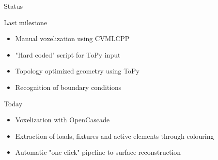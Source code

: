 \begin{frame}{Status}
\begin{block}{Last milestone}
\begin{itemize}
	\item[\textcolor{green}{\Checkmark}] Manual voxelization using CVMLCPP
	\item[\textcolor{green}{\Checkmark}] "Hard coded" script for ToPy input
	\item[\textcolor{green}{\Checkmark}] Topology optimized geometry using ToPy
	\item[\textcolor{red}{\XSolidBrush}] Recognition of boundary conditions
\end{itemize}
\end{block}
\begin{block}{Today}
\begin{itemize}
	\item[\textcolor{green}{\Checkmark}] Voxelization with OpenCascade
	\item[\textcolor{green}{\Checkmark}] Extraction of loads, fixtures and active elements through colouring
	\item[\textcolor{green}{\Checkmark}] Automatic "one click" pipeline to surface reconstruction
\end{itemize}
\end{block}
\end{frame}

